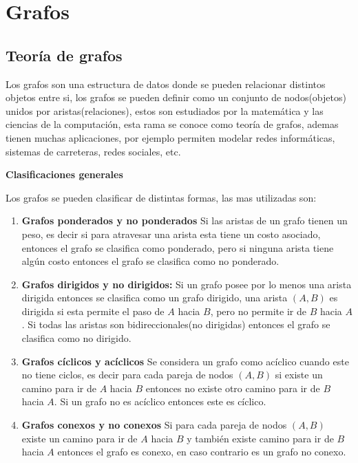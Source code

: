 \documentclass[12pt, a4paper]{article}
\newcommand{\subtitulo}[1]{\begin{center}\textbf{#1}\end{center}}
\begin{document}
	\chapter{Grafos}
	
	
	\section{Teoría de grafos}
	Los grafos son una estructura de datos donde se pueden relacionar distintos objetos entre si, los grafos se pueden
	definir como un conjunto de nodos(objetos) unidos por aristas(relaciones), estos son estudiados por la
	matemática y las ciencias de la computación, esta rama se conoce como teoría de grafos, ademas tienen muchas 
	aplicaciones, por ejemplo permiten modelar redes informáticas, sistemas de carreteras, redes sociales, etc.
	
	\subtitulo{Clasificaciones generales}
	Los grafos se pueden clasificar de distintas formas, las mas utilizadas son:
	\begin{enumerate}[1.]
		\item \textbf{Grafos ponderados y no ponderados} Si las aristas de un grafo tienen un peso, es decir si para
			atravesar una arista esta tiene un costo asociado, entonces el grafo se clasifica como ponderado, pero si 
			ninguna arista tiene algún costo entonces el grafo se clasifica como no ponderado.
		\item \textbf{Grafos dirigidos y no dirigidos:} Si un grafo posee por lo menos una arista dirigida entonces
		 	se clasifica como un grafo dirigido, una arista $(A,B)$ es dirigida si esta permite el paso de $A$ hacia 
		 	$B$, pero no permite ir de $B$ hacia $A$. Si todas las aristas son bidireccionales(no dirigidas) entonces 
		 	el grafo se clasifica como no dirigido.
		\item \textbf{Grafos cíclicos y acíclicos} Se considera un grafo como acíclico cuando este no tiene ciclos, es
			decir para cada pareja de nodos $(A,B)$ si existe un camino para ir de $A$ hacia $B$ entonces no existe 
			otro camino para ir de $B$ hacia $A$. Si un grafo no es acíclico entonces este es cíclico.
		\item \textbf{Grafos conexos y no conexos} Si para cada pareja de nodos $(A,B)$ existe un camino para ir de 
			$A$ hacia $B$ y también existe camino para ir de $B$ hacia $A$ entonces el grafo es conexo, en caso 
			contrario es un grafo no conexo.
	\end{enumerate}
	
\end{document}
